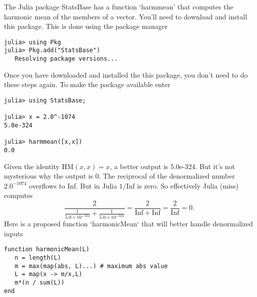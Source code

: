 \documentclass[12pt,fleqn]{exam}
\newcommand{\HM}{\mathrm{HM}}
\newcommand{\Inf}{\mathrm{Inf}}
\begin{document}
The Julia package   StatsBase has a function `harmmean' that computes the harmonic mean of the members
of a vector.  You'll need to download and install this package. This is done using the package manager

\begin{verbatim}
julia> using Pkg
julia> Pkg.add("StatsBase")
   Resolving package versions...
 \end{verbatim}
Once you have downloaded and installed the this package, you don't need to do these steps again. To make the
package available enter

\begin{verbatim}
julia> using StatsBase;

julia> x = 2.0^-1074
5.0e-324

julia> harmmean([x,x])
0.0
\end{verbatim}
Given the identity $  \HM(x,x) =x$, a better output is 5.0e-324. But it's not mysterious why the output is 0.
The reciprocal of the denormalized number $2.0^{-1074}$ overflows to Inf. But in Julia $1/\Inf$ is zero. So effectively Julia (miss) computes 
\begin{equation} 
  \frac{2}{ \frac{1}{5.0\times 10^{-324}}  + \frac{1}{5.0\times 10^{-324}}}= \frac{2}{\Inf + \Inf} = \frac{2}{\Inf} =0.
 \end{equation}
Here is a proposed function `harmonicMean` that will better handle denormalized inputs
\begin{verbatim}
function harmonicMean(L)
   n = length(L)
   m = max(map(abs, L)...) # maximum abs value
   L = map(x -> m/x,L)  
   m*(n / sum(L))
end
\end{verbatim}
\end{document}
